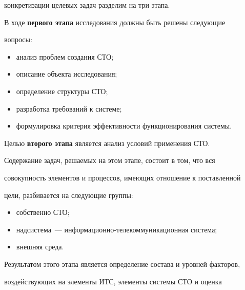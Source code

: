 конкретизации целевых задач разделим на три этапа. 


  


  В ходе \textbf{первого этапа} исследования должны быть решены следующие 


во\-просы:


  \begin{itemize}


  \item анализ проблем создания СТО;


  \item описание объекта исследования;


  \item определение структуры СТО;


  \item разработка требований к системе;


  \item формулировка критерия эффективности функционирования системы.


  \end{itemize}


  


  Целью \textbf{второго этапа} является анализ условий применения СТО. 


  


  Содержание задач, решаемых на этом этапе, состоит в том, что вся 


совокупность элементов и процессов, имеющих отношение к поставленной 


цели, разбивается на следующие группы:


  \begin{itemize}


  \item собственно СТО;


  \item надсистема~--- информационно-телекоммуникационная система;


  \item внешняя среда.


  \end{itemize}


  


  Результатом этого этапа является определение состава и уровней факторов, 


воздействующих на элементы ИТС, элементы системы СТО и оценка 


